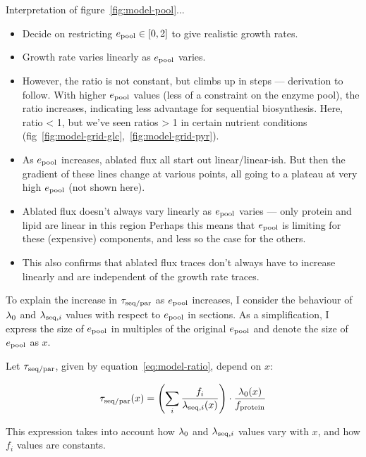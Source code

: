 Interpretation of figure~\ref{fig:model-pool}...

\begin{itemize}
  \item Decide on restricting $e_{\mathrm{pool}} \in [0, 2]$ to give realistic growth rates.
  \item Growth rate varies linearly as $e_{\mathrm{pool}}$ varies.
  \item However, the ratio is not constant, but climbs up in steps --- derivation to follow.
        With higher $e_{\mathrm{pool}}$ values (less of a constraint on the enzyme pool), the ratio increases, indicating less advantage for sequential biosynthesis.
        Here, ratio < 1, but we've seen ratios > 1 in certain nutrient conditions (fig~\ref{fig:model-grid-glc},~\ref{fig:model-grid-pyr}).
  \item As $e_{\mathrm{pool}}$ increases, ablated flux all start out linear/linear-ish.
        But then the gradient of these lines change at various points, all going to a plateau at very high $e_{\mathrm{pool}}$ (not shown here).
  \item Ablated flux doesn't always vary linearly as $e_{\mathrm{pool}}$ varies --- only protein and lipid are linear in this region
        Perhaps this means that $e_{\mathrm{pool}}$ is limiting for these (expensive) components, and less so the case for the others.
  \item This also confirms that ablated flux traces don't always have to increase linearly and are independent of the growth rate traces.
\end{itemize}

To explain the increase in $\tau_{\mathrm{seq}/\mathrm{par}}$ as $e_{\mathrm{pool}}$ increases, I consider the behaviour of $\lambda_{0}$ and $\lambda_{\mathrm{seq},i}$ values with respect to $e_{\mathrm{pool}}$ in sections.
As a simplification, I express the size of $e_{\mathrm{pool}}$ in multiples of the original $e_{\mathrm{pool}}$ and denote the size of $e_{\mathrm{pool}}$ as $x$.

Let $\tau_{\mathrm{seq}/\mathrm{par}}$, given by equation~\ref{eq:model-ratio}, depend on $x$:

\begin{equation}
  \label{eq:model-ratio-x}
  \tau_{\mathrm{seq}/\mathrm{par}}(x) = \left( \sum_i \frac{f_i}{\lambda_{\mathrm{seq},i}(x)} \right) \cdot \frac{\lambda_{0}(x)}{f_{\mathrm{protein}}}
\end{equation}

This expression takes into account how $\lambda_{0}$ and $\lambda_{\mathrm{seq},i}$ values vary with $x$, and how $f_{i}$ values are constants.

